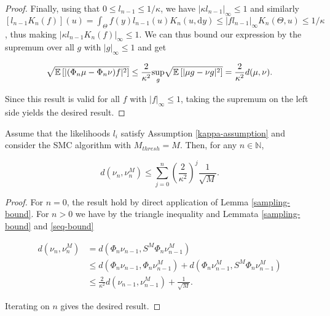 \begin{proof}
  Finally, using that $0 \le l_{n-1} \le 1/\kappa$, we have $|\kappa l_{n-1}|_\infty \le 1$ and similarly $[l_{n-1}K_n(f)](u) = \int_{\Theta} f(y)l_{n-1}(u)K_n(u, \text{d}y) \leq |fl_{n-1}|_\infty K_n(\Theta, u) \leq 1 / \kappa$, thus making $|\kappa l_{n-1}K_n(f)|_\infty \leq 1$. We can thus bound our expression by the supremum over all $g$ with $|g|_\infty \le 1$ and get

  \begin{equation*}
    \sqrt{\mathbb{E}\left[|(\Phi_n\mu - \Phi_n\nu)f|^2\right]} \le \frac2{\kappa^2}\underset{g}{\text{sup}} \sqrt{\mathbb{E}\left[|\mu g - \nu g|^2\right]} =  \frac2{\kappa^2}d(\mu, \nu).
  \end{equation*}

  Since this result is valid for all $f$ with $|f|_\infty \le 1$, taking the supremum on the left side yields the desired result.
\end{proof}

\begin{theorem}
  Assume that the likelihoods $l_i$ satisfy Assumption \ref{kappa-assumption} and consider the SMC algorithm with $M_{thresh} = M$. Then, for any $n \in \mathbb{N}$,

  \begin{equation*}
    d(\nu_n, \nu_n^M) \leq \sum_{j=0}^n\left(\frac2{\kappa^2}\right)^j\frac1{\sqrt{M}}.
  \end{equation*}
\end{theorem}

\begin{proof}
  For $n=0$, the result hold by direct application of Lemma \ref{sampling-bound}. For $n > 0$ we have by the triangle inequality and Lemmata \ref{sampling-bound} and \ref{seq-bound}

  \begin{equation*}
    \begin{aligned}
      d(\nu_n, \nu_n^M)
      &= d(\Phi_n\nu_{n-1}, S^M\Phi_n\nu_{n-1}^M)\\
      &\le d(\Phi_n\nu_{n-1}, \Phi_n\nu_{n-1}^M) + d(\Phi_n\nu_{n-1}^M, S^M\Phi_n\nu_{n-1}^M)\\
      &\le \frac2{\kappa^2}d(\nu_{n-1}, \nu_{n-1}^M) + \frac1{\sqrt{M}}.
    \end{aligned}
  \end{equation*}

  Iterating on $n$ gives the desired result.
\end{proof}

